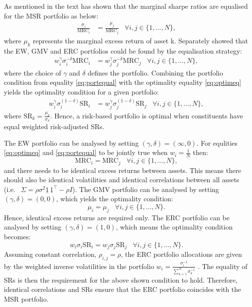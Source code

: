 \documentclass[
]{article}
\begin{document}
As mentioned in the text \citet{S07} has shown that the marginal sharpe ratios are equalised for the MSR
portfolio as below:
\begin{align}
\frac{\mu_i}{\text{MRC}_i} & = \frac{\mu_j}{\text{MRC}_j} \;\;\; \forall i, j \in \{1, ..., N \}, \label{eq:optimeq}
\end{align}
where \(\mu_k\) represents the marginal excess return of asset k. Separately \citet{J13} showed that the
EW, GMV and ERC portfolios could be found by the equalisation strategy:
\begin{align}
w_i^\gamma \sigma^{-\delta}_i \text{MRC}_i & = w_j^\gamma \sigma^{-\delta}_j \text{MRC}_j \;\;\; \forall i, j \in \{1, ..., N \}, \label{eq:portequal}
\end{align}
where the choice of \(\gamma\) and \(\delta\) defines the portfolio. Combining the portfolio condition
from equality \eqref{eq:portequal} with the optimality equality \eqref{eq:optimeq} yields the optimality
condition for a given portfolio:
\begin{align}
w_i^\gamma \sigma_i^{(1- \delta)} \text{SR}_i & = w_j^\gamma \sigma_j^{(1- \delta)} \text{SR}_j \;\;\; \forall i, j \in \{1, ..., N \},
\end{align}
where \(\text{SR}_k = \frac{\mu_k}{\sigma_k}\). Hence, a risk-based portfolio is optimal when
constituents have equal weighted risk-adjusted SRs.

The EW portfolio can be analysed by setting \((\gamma, \delta) = (\infty, 0)\). For equlities
\eqref{eq:optimeq} and \eqref{eq:portequal} to be jointly true when \(w_i = \frac{1}{N}\) then:
\[\text{MRC}_i = \text{MRC}_j \;\;\; \forall i, j \in \{1, ..., N \},\]
and there needs to be identical excess returns between assets. This means there should also be
identical volatilities and identical correlations between all assets (i.e.~
\(\Sigma = \rho\sigma^2 \underline{1} \,\underline{1}^\intercal - \rho I\)). The GMV portfolio can be
analysed by setting \((\gamma, \delta) = (0,0)\), which yields the optimality condition:
\[\mu_i = \mu_j \;\;\; \forall i, j \in \{1, ..., N \}.\]
Hence, identical excess returns are required only. The ERC portfolio can be analysed by setting
\((\gamma, \delta) = (1, 0)\), which means the optimality condition becomes:
\[w_i \sigma_i \text{SR}_i = w_j \sigma_j \text{SR}_j \;\;\; \forall i, j \in \{1, ..., N \}.\]
Assuming constant correlation, \(\rho_{i, j} = \rho\), the ERC portfolio allocations are given by the
weighted inverse volatilities in the portfolio \(w_i = \frac{\sigma^{-1}_i}{\sum_{k = 1}^N \sigma^{-1}_k}\) \citet{MRT10}. The equality of SRs is then the requirement for the above shown condition to
hold. Therefore, identical correlations and SRs ensure that the ERC portfolio coincides with the MSR
portfolio.
\end{document}
